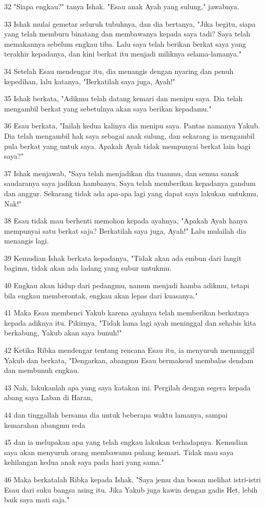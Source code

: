\par 32 "Siapa engkau?" tanya Ishak. "Esau anak Ayah yang sulung," jawabnya.
\par 33 Ishak mulai gemetar seluruh tubuhnya, dan dia bertanya, "Jika begitu, siapa yang telah memburu binatang dan membawanya kepada saya tadi? Saya telah memakannya sebelum engkau tiba. Lalu saya telah berikan berkat saya yang terakhir kepadanya, dan kini berkat itu menjadi miliknya selama-lamanya."
\par 34 Setelah Esau mendengar itu, dia menangis dengan nyaring dan penuh kepedihan, lalu katanya, "Berkatilah saya juga, Ayah!"
\par 35 Ishak berkata, "Adikmu telah datang kemari dan menipu saya. Dia telah mengambil berkat yang sebetulnya akan saya berikan kepadamu."
\par 36 Esau berkata, "Inilah kedua kalinya dia menipu saya. Pantas namanya Yakub. Dia telah mengambil hak saya sebagai anak sulung, dan sekarang ia mengambil pula berkat yang untuk saya. Apakah Ayah tidak mempunyai berkat lain bagi saya?"
\par 37 Ishak menjawab, "Saya telah menjadikan dia tuanmu, dan semua sanak saudaranya saya jadikan hambanya. Saya telah memberikan kepadanya gandum dan anggur. Sekarang tidak ada apa-apa lagi yang dapat saya lakukan untukmu, Nak!"
\par 38 Esau tidak mau berhenti memohon kepada ayahnya, "Apakah Ayah hanya mempunyai satu berkat saja? Berkatilah saya juga, Ayah!" Lalu mulailah dia menangis lagi.
\par 39 Kemudian Ishak berkata kepadanya, "Tidak akan ada embun dari langit bagimu, tidak akan ada ladang yang subur untukmu.
\par 40 Engkau akan hidup dari pedangmu, namun menjadi hamba adikmu, tetapi bila engkau memberontak, engkau akan lepas dari kuasanya."
\par 41 Maka Esau membenci Yakub karena ayahnya telah memberikan berkatnya kepada adiknya itu. Pikirnya, "Tidak lama lagi ayah meninggal dan sehabis kita berkabung, Yakub akan saya bunuh!"
\par 42 Ketika Ribka mendengar tentang rencana Esau itu, ia menyuruh memanggil Yakub dan berkata, "Dengarkan, abangmu Esau bermaksud membalas dendam dan membunuh engkau.
\par 43 Nah, lakukanlah apa yang saya katakan ini. Pergilah dengan segera kepada abang saya Laban di Haran,
\par 44 dan tinggallah bersama dia untuk beberapa waktu lamanya, sampai kemarahan abangmu reda
\par 45 dan ia melupakan apa yang telah engkau lakukan terhadapnya. Kemudian saya akan menyuruh orang membawamu pulang kemari. Tidak mau saya kehilangan kedua anak saya pada hari yang sama."
\par 46 Maka berkatalah Ribka kepada Ishak, "Saya jemu dan bosan melihat istri-istri Esau dari suku bangsa asing itu. Jika Yakub juga kawin dengan gadis Het, lebih baik saya mati saja."

